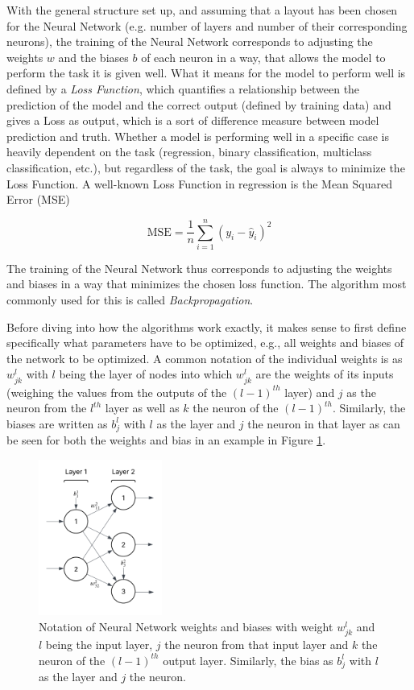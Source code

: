 With the general structure set up, and assuming that a layout has been chosen for the Neural Network (e.g. number of layers and number of their corresponding neurons), the training of the Neural Network corresponds to adjusting the weights $w$ and the biases $b$ of each neuron in a way, that allows the model to perform the task it is given well. What it means for the model to perform well is defined by a \textit{Loss Function}, which quantifies a relationship between the prediction of the model and the correct output (defined by training data) and gives a Loss as output, which is a sort of difference measure between model prediction and truth. Whether a model is performing well  in a specific case is heavily dependent on the task (regression, binary classification, multiclass classification, etc.), but regardless of the task, the goal is always to minimize the Loss Function. A well-known Loss Function in regression is the Mean Squared Error (MSE)

\[
\text{MSE} = \frac{1}{n} \sum_{i=1}^{n} (y_i - \hat{y}_i)^2
\]

The training of the Neural Network thus corresponds to adjusting the weights and biases in a way that minimizes the chosen loss function. The algorithm most commonly used for this is called \textit{Backpropagation}.
 \cite{nielsen2015neuralChap1}
 
 Before diving into how the algorithms work exactly, it makes sense to first define specifically what parameters have to be optimized, e.g., all weights and biases of the network to be optimized. A common notation of the individual weights is as $w_{jk}^l$ with $l$ being the layer of nodes into which $w_{jk}^l$ are the weights of its inputs (weighing the values from the outputs of the $(l-1)^{th}$ layer) and $j$ as the neuron from the $l^{th}$ layer as well as $k$ the neuron of the  $(l-1)^{th}$. Similarly, the biases are written as $b_j^l$ with $l$ as the layer and $j$ the neuron in that layer as can be seen for both the weights and bias in an example in Figure \ref{fig:bias_and_weights_notation}.
 
 
 \begin{figure}[h] 
 	\centering
 	\includegraphics[width=0.36\textwidth]{../figures/modelling/bias_and_weights_notation.png} 
 	\caption{Notation of Neural Network weights and biases with weight $w_{jk}^l$ and $l$ being the input layer,  $j$ the neuron from that input layer and $k$ the neuron of the  $(l-1)^{th}$ output layer. Similarly, the bias as $b_j^l$ with $l$ as the layer and $j$ the neuron.}
 	\label{fig:bias_and_weights_notation}
 \end{figure}
 
